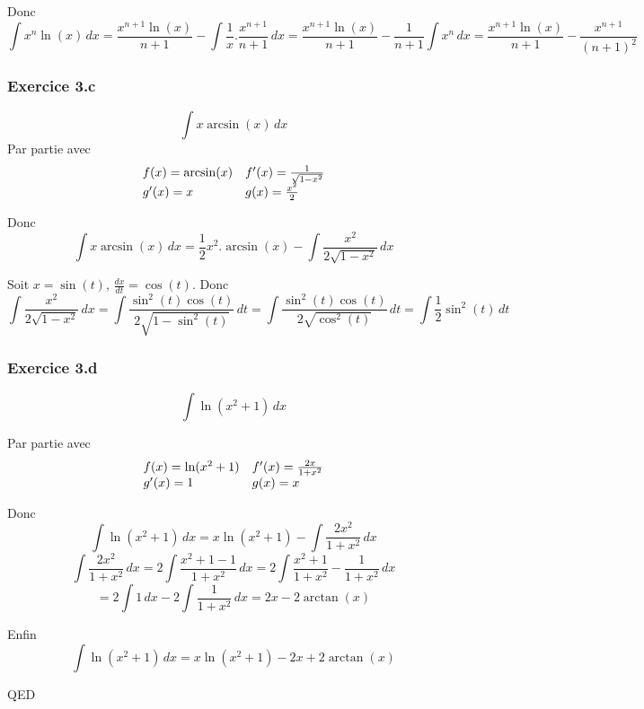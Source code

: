 \documentclass[]{book}
\theoremstyle{definition}
\begin{document}
Donc
$$\int{x^n\ln(x)\,dx} = \frac{x^{n+1}\ln(x)}{n+1} - \int{\frac{1}{x}.\frac{x^{n+1}}{n+1}\,dx} = \frac{x^{n+1}\ln(x)}{n+1} - \frac{1}{n+1}\int{x^n\,dx} = \frac{x^{n+1}\ln(x)}{n+1} - \frac{x^{n+1}}{(n+1)^2}$$


\subsubsection*{Exercice 3.c}
$$\int{x\arcsin(x)\,dx}$$
Par partie avec
$$
\begin{array}{l l}
f(x) = \arcsin(x) & f'(x)=\frac{1}{\sqrt{1-x^2}} \\
g'(x)= x & g(x) = \frac{x^{2}}{2} \\
\end{array}
$$

Donc
$$\int{x\arcsin(x)\,dx} = \frac{1}{2}x^{2}.\arcsin(x) - \int{\frac{x^2}{2\sqrt{1-x^2}}\,dx}$$

Soit $x = \sin(t)$, $\frac{dx}{dt}=\cos(t)$.
Donc
$$\int{\frac{x^2}{2\sqrt{1-x^2}}\,dx} = \int{\frac{\sin^2(t)\cos(t)}{2\sqrt{1-\sin^2(t)}}\,dt} = \int{\frac{\sin^2(t)\cos(t)}{2\sqrt{\cos^2(t)}}\,dt} = \int{\frac{1}{2}\sin^2(t)\,dt}$$

\subsubsection*{Exercice 3.d}
$$\int{\ln(x^2+1)\,dx}$$

Par partie avec
$$
\begin{array}{l l}
f(x) = \ln(x^2+1) & f'(x)=\frac{2x}{1+x^2} \\
g'(x)= 1 & g(x) = x \\
\end{array}
$$

Donc
$$\int{\ln(x^2+1)\,dx} = x\ln(x^2+1) - \int{\frac{2x^2}{1+x^2}\,dx}$$
$$\int{\frac{2x^2}{1+x^2}\,dx} = 2\int{\frac{x^2+1-1}{1+x^2}\,dx} = 2\int{\frac{x^2+1}{1+x^2}-\frac{1}{1+x^2}\,dx}$$
$$=2\int{1\,dx}-2\int{\frac{1}{1+x^2}\,dx} = 2x - 2\arctan(x)$$

Enfin
$$\int{\ln(x^2+1)\,dx} = x\ln(x^2+1) - 2x + 2\arctan(x)$$


QED
\end{document}
